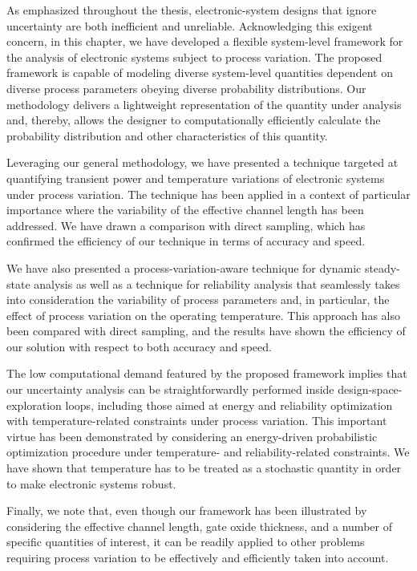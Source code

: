 As emphasized throughout the thesis, electronic-system designs that ignore
uncertainty are both inefficient and unreliable. Acknowledging this exigent
concern, in this chapter, we have developed a flexible system-level framework
for the analysis of electronic systems subject to process variation. The
proposed framework is capable of modeling diverse system-level quantities
dependent on diverse process parameters obeying diverse probability
distributions. Our methodology delivers a lightweight representation of the
quantity under analysis and, thereby, allows the designer to computationally
efficiently calculate the probability distribution and other characteristics of
this quantity.

Leveraging our general methodology, we have presented a technique targeted at
quantifying transient power and temperature variations of electronic systems
under process variation. The technique has been applied in a context of
particular importance where the variability of the effective channel length has
been addressed. We have drawn a comparison with direct sampling, which has
confirmed the efficiency of our technique in terms of accuracy and speed.

We have also presented a process-variation-aware technique for dynamic
steady-state analysis as well as a technique for reliability analysis that
seamlessly takes into consideration the variability of process parameters and,
in particular, the effect of process variation on the operating temperature.
This approach has also been compared with direct sampling, and the results have
shown the efficiency of our solution with respect to both accuracy and speed.

The low computational demand featured by the proposed framework implies that our
uncertainty analysis can be straightforwardly performed inside
design-space-exploration loops, including those aimed at energy and reliability
optimization with temperature-related constraints under process variation. This
important virtue has been demonstrated by considering an energy-driven
probabilistic optimization procedure under temperature- and reliability-related
constraints. We have shown that temperature has to be treated as a stochastic
quantity in order to make electronic systems robust.

Finally, we note that, even though our framework has been illustrated by
considering the effective channel length, gate oxide thickness, and a number of
specific quantities of interest, it can be readily applied to other problems
requiring process variation to be effectively and efficiently taken into
account.
